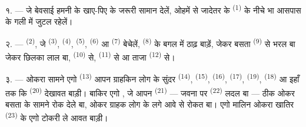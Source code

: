 %

\VUsaut{4.0mm}
\VUsaut{3.0mm}

\VUsaut{3.0mm}

१. --- जे बेवसाई हमनी के खाए-पिए के जरूरी सामान देलें, ओहमें से जादेतर
 के  \textsuperscript{(1)} के नीचे भा
आसपास के गली में जुटल रहेलें।

२. ---  \textsuperscript{(2)}, जे 
\textsuperscript{(3)},  \textsuperscript{(4)},
 \textsuperscript{(5)}, 
\textsuperscript{(6)} आ  \textsuperscript{(7)} बेचेलें,
 \textsuperscript{(8)} के बगल में ठाढ़
बाड़ें, जेकर बसता  \textsuperscript{(9)} से भरल बा
जेकर छिलका लाल बा,  \textsuperscript{(10)} से,
 \textsuperscript{(11)} से आ ताजा  \textsuperscript{(12)} से।

३. --- ओकरा सामने एगो  \textsuperscript{(13)} आपन
ग्राहकिन लोग के सुंदर  \textsuperscript{(14)},
 \textsuperscript{(15)},  \textsuperscript{(16)},
 \textsuperscript{(17)}, 
\textsuperscript{(19)},  \textsuperscript{(18)} आ इहाँ तक कि
 \textsuperscript{(20)} देखावत बाड़ी। बाकिर एगो
, जे आपन 
\textsuperscript{(21)} — जवना पर  \textsuperscript{(22)}
लदल बा — ठीक ओकर बसता के सामने रोक देले बा, ओकर ग्राहक लोग के लगे आवे
से रोकत बा। एगो मालिन ओकरा खातिर  \textsuperscript{(23)} के
एगो टोकरी ले आवत बाड़ी।

